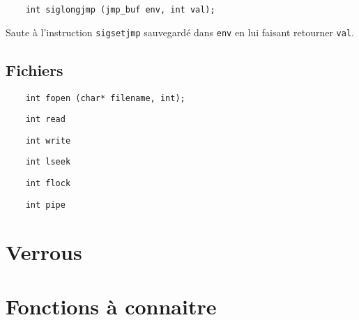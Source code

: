 \documentclass[10pt,twocolumn,a4paper]{article}
\begin{document}
\begin{lstlisting}
    int siglongjmp (jmp_buf env, int val);
\end{lstlisting}
Saute à l'instruction \texttt{sigsetjmp} sauvegardé dans \texttt{env} en lui faisant retourner \texttt{val}.

\subsection{Fichiers}

\begin{lstlisting}
    int fopen (char* filename, int);
\end{lstlisting}

\begin{lstlisting}
    int read
\end{lstlisting}

\begin{lstlisting}
    int write
\end{lstlisting}

\begin{lstlisting}
    int lseek
\end{lstlisting}

\begin{lstlisting}
    int flock
\end{lstlisting}

\begin{lstlisting}
    int pipe
\end{lstlisting}








\section{Verrous}

\section{Fonctions à connaitre}
\end{document}

